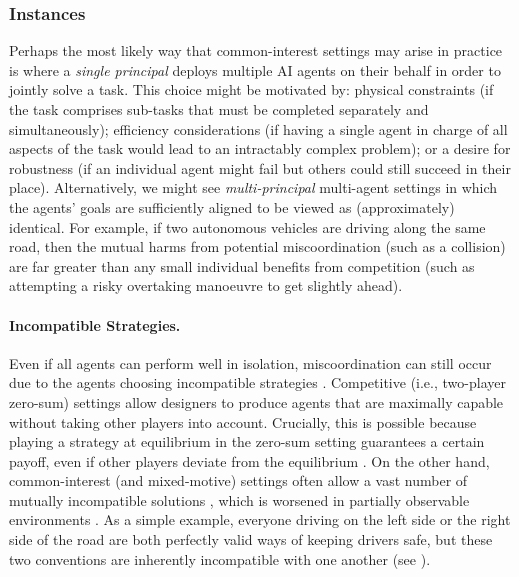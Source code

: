 \subsubsection{Instances}

Perhaps the most likely way that common-interest settings may arise in practice is where a \textit{single principal} deploys multiple AI agents on their behalf in order to jointly solve a task.
This choice might be motivated by: physical constraints (if the task comprises sub-tasks that must be completed separately and simultaneously); efficiency considerations (if having a single agent in charge of all aspects of the task would lead to an intractably complex problem); or a desire for robustness (if an individual agent might fail but others could still succeed in their place).
Alternatively, we might see \textit{multi-principal} multi-agent settings in which the agents' goals are sufficiently aligned to be viewed as (approximately) identical.
For example, if two autonomous vehicles are driving along the same road, then the mutual harms from potential miscoordination (such as a collision) are far greater than any small individual benefits from competition (such as attempting a risky overtaking manoeuvre to get slightly ahead).

\paragraph{Incompatible Strategies.}
Even if all agents can perform well in isolation, miscoordination can still occur due to the agents choosing incompatible strategies \citep{Cooper1990}.
Competitive (i.e., two-player zero-sum) settings allow designers to produce agents that are maximally capable without taking other players into account. 
Crucially, this is possible because playing a strategy at equilibrium in the zero-sum setting guarantees a certain payoff, even if other players deviate from the equilibrium \citep{nash_non-cooperative_1951}. 
On the other hand, common-interest (and mixed-motive) settings often allow a vast number of mutually incompatible solutions \citep{Schelling1980-cq}, which is worsened in partially observable environments \citep{Reif1984,bernstein_complexity_2002}.
As a simple example, everyone driving on the left side or the right side of the road are both perfectly valid ways of keeping drivers safe, but these two conventions are inherently incompatible with one another (see ).

